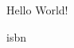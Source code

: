 \documentclass{minimal}
\begin{document}
Hello World!

\gls{isbn}

\printunsrtglossaries
\end{document}
